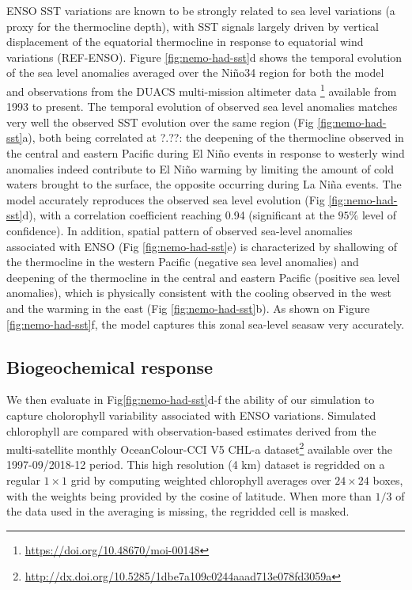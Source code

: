 ENSO SST variations are known to be strongly related to sea level variations (a proxy for the thermocline depth), with SST signals largely driven by vertical displacement of the equatorial thermocline in response to equatorial wind variations (REF-ENSO). Figure \ref{fig:nemo-had-sst}d shows the temporal evolution of the sea level anomalies averaged over the Niño34 region for both the model and observations from the DUACS multi-mission altimeter data \footnote{\url{https://doi.org/10.48670/moi-00148}} available from 1993 to present. The temporal evolution of observed sea level anomalies matches very well the observed SST evolution over the same region (Fig \ref{fig:nemo-had-sst}a), both being correlated at ?.??: the deepening of the thermocline observed in the central and eastern Pacific during El Niño events in response to westerly wind anomalies indeed contribute to El Niño warming by limiting the amount of cold waters brought to the surface, the opposite occurring during La Niña events.  The model accurately reproduces the observed sea level evolution (Fig \ref{fig:nemo-had-sst}d), with a correlation coefficient reaching 0.94 (significant at the $95\%$ level of confidence). In addition,  spatial pattern of observed sea-level anomalies associated with ENSO (Fig \ref{fig:nemo-had-sst}e) is characterized by shallowing of the thermocline  in the western Pacific (negative sea level anomalies) and deepening of the thermocline  in the central and eastern Pacific (positive sea level anomalies), which is physically consistent with the cooling observed in the west and the warming in the east (Fig \ref{fig:nemo-had-sst}b). As shown on Figure \ref{fig:nemo-had-sst}f, the model captures this zonal sea-level seasaw very accurately.

\subsection{Biogeochemical response}

We then evaluate in Fig\ref{fig:nemo-had-sst}d-f the ability of our simulation to capture cholorophyll variability associated with ENSO variations. Simulated chlorophyll are compared with observation-based estimates derived from the multi-satellite monthly OceanColour-CCI V5 CHL-a dataset\footnote{\url{http://dx.doi.org/10.5285/1dbe7a109c0244aaad713e078fd3059a}} \citep{sathyendranathOceanColourTimeSeries2019} available over the 1997-09/2018-12 period. This high resolution (4 km)  dataset is regridded on a regular $1\times 1$ grid by computing weighted chlorophyll averages over $24\times24$ boxes, with the weights being provided by the cosine of latitude. When more than $1/3$ of the data used in the averaging is missing, the regridded cell is masked.



